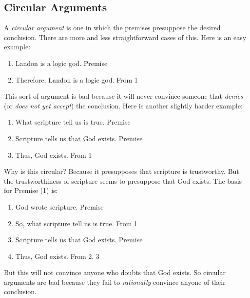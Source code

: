 \documentclass[oneside,letterpaper,12pt]{book}
\begin{document}
\subsection*{Circular Arguments}
A \textit{circular argument} is one in which the premises presuppose the desired conclusion. There are more and less straightforward cases of this. Here is an easy example:
\begin{enumerate}
	\item Landon is a logic god. \hfill Premise
	\item Therefore, Landon is a logic god. \hfill From 1
\end{enumerate}
This sort of argument is bad because it will never convince someone that \textit{denies} (or \textit{does not yet accept}) the conclusion. Here is another slightly harder example:
\begin{enumerate}
	\item What scripture tell us is true. \hfill Premise
	\item Scripture tells us that God exists. \hfill Premise
	\item Thus, God exists. \hfill From 1
\end{enumerate}
Why is this circular? Because it presupposes that scripture is trustworthy. But the trustworthiness of scripture seems to presuppose that God exists. The basis for Premise (1) is:
\begin{enumerate}
	\item God wrote scripture. \hfill Premise
	\item So, what scripture tell us is true. \hfill From 1
	\item Scripture tells us that God exists. \hfill Premise
	\item Thus, God exists. \hfill From 2, 3
\end{enumerate}
But this will not convince anyone who doubts that God exists. So circular arguments are bad because they fail to \textit{rationally} convince anyone of their conclusion.
\end{document}
